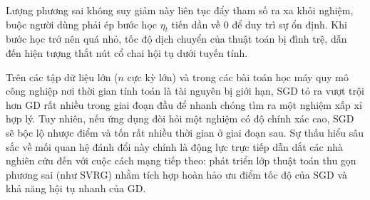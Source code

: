 Lượng phương sai không suy giảm này liên tục đẩy tham số ra xa khỏi nghiệm, buộc người dùng phải ép bước học $\eta_t$ tiến dần về 0 để duy trì sự ổn định. Khi bước học trở nên quá nhỏ, tốc độ dịch chuyển của thuật toán bị đình trệ, dẫn đến hiện tượng thắt nút cổ chai hội tụ dưới tuyến tính.

Trên các tập dữ liệu lớn ($n$ cực kỳ lớn) và trong các bài toán học máy quy mô công nghiệp nơi thời gian tính toán là tài nguyên bị giới hạn, SGD tỏ ra vượt trội hơn GD rất nhiều trong giai đoạn đầu để nhanh chóng tìm ra một nghiệm xấp xỉ hợp lý. Tuy nhiên, nếu ứng dụng đòi hỏi một nghiệm có độ chính xác cao, SGD sẽ bộc lộ nhược điểm và tốn rất nhiều thời gian ở giai đoạn sau. Sự thấu hiểu sâu sắc về mối quan hệ đánh đổi này chính là động lực trực tiếp dẫn dắt các nhà nghiên cứu đến với cuộc cách mạng tiếp theo: phát triển lớp thuật toán thu gọn phương sai (như SVRG) nhằm tích hợp hoàn hảo ưu điểm tốc độ của SGD và khả năng hội tụ nhanh của GD.
% 